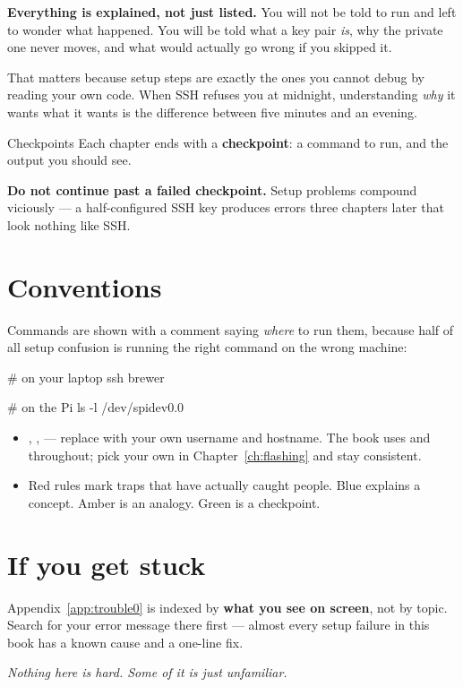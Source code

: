 \textbf{Everything is explained, not just listed.} You will not be told to run
 and left to wonder what happened. You will be told
what a key pair \emph{is}, why the private one never moves, and what would
actually go wrong if you skipped it.

That matters because setup steps are exactly the ones you cannot debug by
reading your own code. When SSH refuses you at midnight, understanding
\emph{why} it wants what it wants is the difference between five minutes and an
evening.

\begin{concept}{Checkpoints}
Each chapter ends with a \textbf{checkpoint}: a command to run, and the output
you should see.

\textbf{Do not continue past a failed checkpoint.} Setup problems compound
viciously --- a half-configured SSH key produces errors three chapters later
that look nothing like SSH.
\end{concept}

\section*{Conventions}

Commands are shown with a comment saying \emph{where} to run them, because half
of all setup confusion is running the right command on the wrong machine:

\begin{shell}
# on your laptop
ssh brewer

# on the Pi
ls -l /dev/spidev0.0
\end{shell}

\begin{itemize}
  \item {}, ,  --- replace with your
        own username and hostname. The book uses  and
         throughout; pick your own in Chapter~\ref{ch:flashing}
        and stay consistent.
  \item \textcolor{brewerred}{Red rules} mark traps that have actually caught
        people. \textcolor{brewerblue}{Blue} explains a concept.
        \textcolor{breweramber}{Amber} is an analogy.
        \textcolor{brewergreen}{Green} is a checkpoint.
\end{itemize}

\section*{If you get stuck}

Appendix~\ref{app:trouble0} is indexed by \textbf{what you see on screen}, not by
topic. Search for your error message there first --- almost every setup failure
in this book has a known cause and a one-line fix.

\vspace{1em}
\begin{flushright}\itshape
Nothing here is hard. Some of it is just unfamiliar.
\end{flushright}
